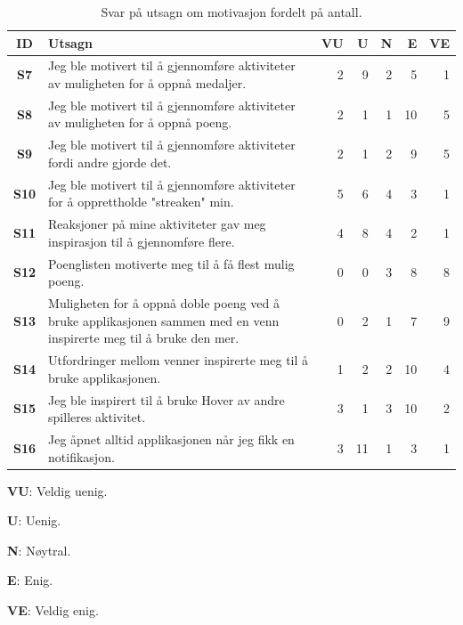   \begin{table}[H]     \small
    
    \begin{threeparttable}[t]
    \begin{tabularx}{\textwidth}{|>{\bfseries}c|X|r|r|r|r|r|}
        \hline  \textbf{ID} &  \textbf{Utsagn} & \textbf{VU }  &  \textbf{U}  &  \textbf{N}  &  \textbf{E}  &  \textbf{VE}  \\ \hline
        S7 & Jeg ble motivert til å gjennomføre aktiviteter av muligheten for å oppnå medaljer.  & 2 & 9 & 2 & 5 & 1 \\ 
        S8 & Jeg ble motivert til å gjennomføre aktiviteter av muligheten for å oppnå poeng.  & 2 & 1 & 1 & 10 & 5 \\ 
        S9 & Jeg ble motivert til å gjennomføre aktiviteter fordi andre gjorde det.  & 2 & 1 & 2 & 9 & 5 \\ 
        S10 & Jeg ble motivert til å gjennomføre aktiviteter for å opprettholde "streaken" min.  & 5 & 6 & 4 & 3 & 1 \\ 
        S11 & Reaksjoner på mine aktiviteter gav meg inspirasjon til å gjennomføre flere.  & 4 & 8 & 4 & 2 & 1 \\ 
        S12 & Poenglisten motiverte meg til å få flest mulig poeng.  & 0 & 0 & 3 & 8 & 8 \\ 
        S13 & Muligheten for å oppnå doble poeng ved å bruke applikasjonen sammen med en venn inspirerte meg til å bruke den mer.  & 0 & 2 & 1 & 7 & 9 \\ 
        S14 & Utfordringer mellom venner inspirerte meg til å bruke applikasjonen.  & 1 & 2 & 2 & 10 & 4 \\ 
        S15 & Jeg ble inspirert til å bruke Hover av andre spilleres aktivitet.  & 3 & 1 & 3 & 10 & 2 \\ 
        S16 & Jeg åpnet alltid applikasjonen når jeg fikk en notifikasjon.  & 3 & 11 & 1 & 3 & 1 \\
         \hline
    \end{tabularx}
    \begin{tablenotes}
    \scriptsize
     \item[] \textbf{VU}: Veldig uenig.
     \item[] \textbf{U}: Uenig.
     \item[] \textbf{N}: Nøytral.
     \item[] \textbf{E}: Enig.
     \item[] \textbf{VE}: Veldig enig.
   \end{tablenotes}
   \end{threeparttable}
   \caption{Svar på utsagn om motivasjon fordelt på antall.}
\end{table}



